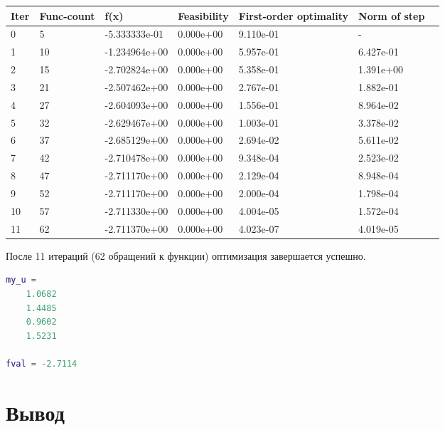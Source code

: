 \documentclass[14pt,a4paper,report]{report}
\begin{document}
\begin{tabular}{  | l | l | l | l | l | l | l | }
\hline
Iter & Func-count & f(x) &  Feasibility & First-order optimality &  Norm of step\\ \hline
    0 &       5  & -5.333333e-01  &  0.000e+00  &  9.110e-01 & - \\ \hline
    1   &   10  & -1.234964e+00  &   0.000e+00   & 5.957e-01  &  6.427e-01\\ \hline
    2  &    15 &  -2.702824e+00  &  0.000e+00   & 5.358e-01   & 1.391e+00\\ \hline
    3    &  21 &  -2.507462e+00  &  0.000e+00 &    2.767e-01  &  1.882e-01\\ \hline
    4   &   27 &  -2.604093e+00 &   0.000e+00  &  1.556e-01 &   8.964e-02\\ \hline
    5  &    32 &  -2.629467e+00 &   0.000e+00 &   1.003e-01  &  3.378e-02\\ \hline
    6  &    37 &  -2.685129e+00  &  0.000e+00  &  2.694e-02  &  5.611e-02\\ \hline
    7   &   42 &  -2.710478e+00 &   0.000e+00  &  9.348e-04  &  2.523e-02\\ \hline
    8  &    47 &  -2.711170e+00  &  0.000e+00 &   2.129e-04  &  8.948e-04\\ \hline
    9  &    52  & -2.711170e+00  &  0.000e+00  &  2.000e-04  &  1.798e-04\\ \hline
   10  &    57 &  -2.711330e+00  &  0.000e+00  &  4.004e-05  &  1.572e-04\\ \hline
   11   &   62 &  -2.711370e+00  &  0.000e+00  &  4.023e-07  &  4.019e-05\\ \hline
\end{tabular}

После 11 итераций (62 обращений к функции) оптимизация завершается успешно. 
   
\begin{lstlisting}[language={matlab}, caption={Результаты}, basicstyle=\ttfamily]
my_u =
    1.0682
    1.4485
    0.9602
    1.5231

fval = -2.7114
\end{lstlisting}

\section{Вывод}
\end{document}
